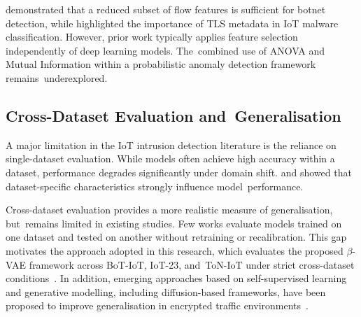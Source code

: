 \documentclass[futureinternet,article,accept,moreauthors]{Definitions/mdpi}
\begin{document}
\citet{koroniotis2019} demonstrated that a reduced subset of flow features is sufficient for botnet detection, while \citet{garcia2020} highlighted the importance of TLS metadata in IoT malware classification. However, prior work typically applies feature selection independently of deep learning models. The~combined use of ANOVA and Mutual Information within a probabilistic anomaly detection framework remains~underexplored.

\subsection{Cross-Dataset Evaluation and~Generalisation}

A major limitation in the IoT intrusion detection literature is the reliance on single-dataset evaluation. While models often achieve high accuracy within a dataset, performance degrades significantly under domain shift. \citet{koroniotis2019} and \citet{garcia2020} showed that dataset-specific characteristics strongly influence model~performance.

Cross-dataset evaluation provides a more realistic measure of generalisation, but~remains limited in existing studies. Few works evaluate models trained on one dataset and tested on another without retraining or recalibration. This gap motivates the approach adopted in this research, which evaluates the proposed $\beta$-VAE framework across BoT-IoT, IoT-23, and~ToN-IoT under strict cross-dataset conditions~\cite{cantone2024}.
In addition, emerging approaches based on self-supervised learning and generative modelling, including diffusion-based frameworks, have been proposed to improve generalisation in encrypted traffic environments~\cite{sattar2025b,li2025}.

\end{document}
